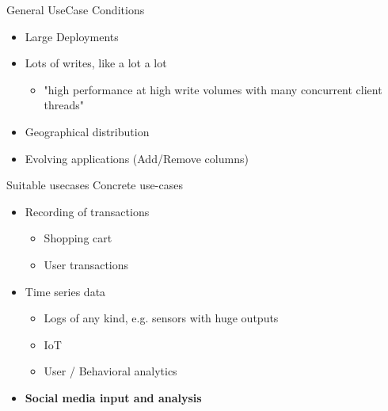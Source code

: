\documentclass[
  10pt
]{beamer}
\begin{document}
\begin{frame}{General UseCase Conditions}
 \begin{itemize}
    \item<1-> Large Deployments
    \item<2-> Lots of writes, like a lot a lot
      \begin{itemize}
        \item<3-> "high performance at high write volumes with many concurrent client threads"
      \end{itemize}
    \item<4-> Geographical distribution
    \item<5-> Evolving applications (Add/Remove columns)
 \end{itemize}


\end{frame}

\begin{frame}{Suitable usecases}
  Concrete use-cases
  \begin{itemize}
    \item Recording of transactions
      \begin{itemize}
        \item Shopping cart
        \item User transactions
      \end{itemize}
    \item Time series data
      \begin{itemize}
        \item Logs of any kind, e.g. sensors with huge outputs
        \item IoT
        \item User / Behavioral analytics
      \end{itemize}
    \item \textbf{Social media input and analysis}
  \end{itemize}


\end{frame}
\end{document}
